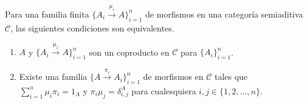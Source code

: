 \documentclass[tesis]{subfiles}
\begin{document}
\begin{Prop} \label{Mendoza-1.9.2}
    Para una familia finita $\{A_i\xrightarrow[]{\mu_i} A\}_{i=1}^n$ de morfismos en una categoría semiaditiva $\mathscr{C}$, las siguientes condiciones son equivalentes.

    \begin{enumerate}[label=(\alph*)]
        \item $A$ y $\{A_i\xrightarrow[]{\mu_i} A\}_{i=1}^n$ son un coproducto en $\mathscr{C}$ para $\{A_i\}_{i=1}^n$.

        \item Existe una familia $\{A\xrightarrow[]{\pi_i} A_i\}_{i=1}^n$ de morfismos en $\mathscr{C}$ tales que $\sum_{i=1}^n \mu_i\pi_i = 1_A$ y $\pi_i\mu_j = \delta_{i,j}^A$ para cualesquiera $i,j\in\{1,2,...,n\}$.
    \end{enumerate}
\end{Prop}
\end{document}
